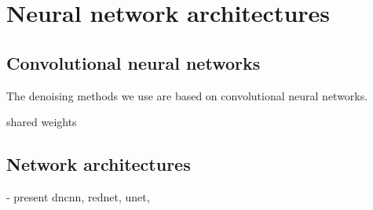 \chapter{Neural network architectures}

\section{Convolutional neural networks}

The denoising methods we use are based on convolutional neural networks. 

shared weights

\section{Network architectures}
- present dncnn, rednet, unet, 
